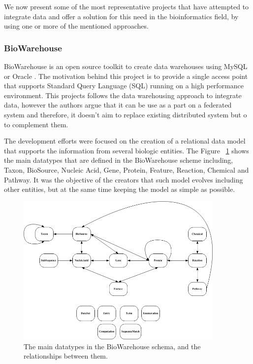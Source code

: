 We now present some of the most representative projects that have attempted to integrate data and offer a solution for this need in the bioinformatics field, by using one or more of the mentioned approaches. 

\subsubsection{BioWarehouse}
BioWarehouse is an open source toolkit to create data warehouses using MySQL or Oracle \cite{LEE2006}. The motivation behind this project is to provide  a single access point that supports Standard Query Language (SQL) running on a high performance environment.
This projects follows the data warehousing approach to integrate data, however the authors argue that it can be use as a part on a federated system and therefore, it doesn't aim to replace existing distributed system but o to complement them.

The development efforts were focused on the creation of a relational data model that supports the information from several biologic entities. The Figure ~\ref{fig:biowarehouse} shows the main datatypes that are defined in the BioWarehouse scheme including, Taxon, BioSource, Nucleic Acid, Gene, Protein, Feature, Reaction, Chemical and Pathway. It was the objective of the creators that such model evolves including other entities, but at the same time keeping the model as simple as possible.
\begin{figure}  
\includegraphics[width=4in]{figures/biowarehouse.png}
\caption[Original BioWarehouse schema.]{The main datatypes in the BioWarehouse schema, and the relationships between them.
\label{fig:biowarehouse}}
\end{figure}

